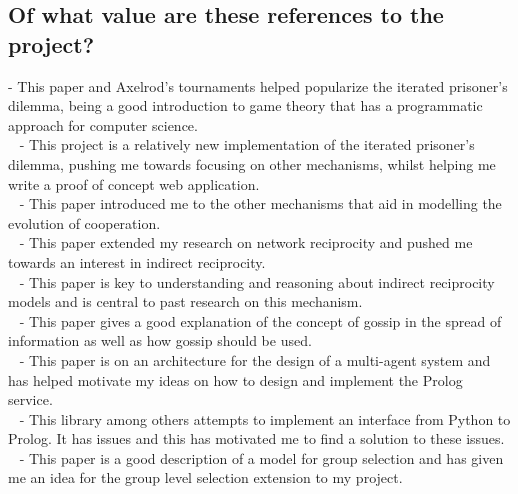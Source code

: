 \documentclass{article}
\begin{document}
{}


\subsection*{Of what value are these references to the project?}
\cite{evolution_of_cooperation} - This paper and Axelrod's tournaments helped popularize the iterated prisoner's dilemma, being a good introduction to game theory that has a programmatic approach for computer science.\\
~\cite{axelrodproject} - This project is a relatively new implementation of the iterated prisoner's dilemma, pushing me towards focusing on other mechanisms, whilst helping me write a proof of concept web application.\\
~\cite{five_rules_coop} - This paper introduced me to the other mechanisms that aid in modelling the evolution of cooperation.\\
~\cite{spatial} - This paper extended my research on network reciprocity and pushed me towards an interest in indirect reciprocity.\\
~\cite{evol_indirect_image} - This paper is key to understanding and reasoning about indirect reciprocity models and is central to past research on this mechanism.\\
~\cite{gossip_alt} - This paper gives a good explanation of the concept of gossip in the spread of information as well as how gossip should be used.\\
~\cite{prosocs} - This paper is on an architecture for the design of a multi-agent system and has helped motivate my ideas on how to design and implement the Prolog service.\\
~\cite{pyswip} - This library among others attempts to implement an interface from Python to Prolog. It has issues and this has motivated me to find a solution to these issues.\\
~\cite{multilevel_nowak} - This paper is a good description of a model for group selection and has given me an idea for the group level selection extension to my project.\\
\end{document}
